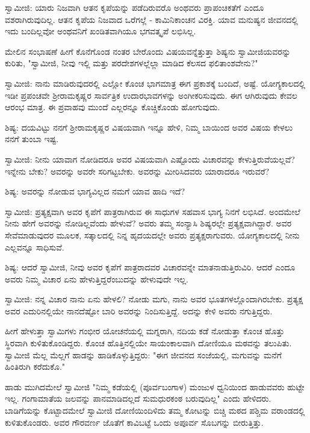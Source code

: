 ಸ್ವಾಮೀಜಿ: ಯಾರು ನಿಜವಾಗಿ ಆತನ ಕೃಪೆಯನ್ನು ಪಡೆದಿರುವರೊ ಅಂಥವರು ಪ್ರಾಪಂಚಿಕತೆಗೆ ಎಂದೂ ವಶರಾಗಿರುವುದಿಲ್ಲ. ಆತನ ಕೃಪೆಯ ನಿಜವಾದ ಒರೆಗಲ್ಲೆ - ಕಾಮಿನಿಕಾಂಚನ ವಿರಕ್ತಿ. ಯಾವ ಮನುಷ್ಯನ ಜೀವನದಲ್ಲಿ ಇದು ಬಂದಿಲ್ಲವೋ ಅಂಥವನಿಗೆ ಖಂಡಿತವಾಗಿಯೂ ಭಗವತ್ಕೃಪೆ ಲಭಿಸಿಲ್ಲ.

ಮೇಲಿನ ಸಂಭಾಷಣೆ ಹೀಗೆ ಕೊನೆಗೊಂಡ ನಂತರ ಬೇರೊಂದು ವಿಷಯವನ್ನೆತ್ತುತ್ತಾ ಶಿಷ್ಯನು ಸ್ವಾಮೀಜಿಯವರನ್ನು ಕುರಿತು, "ಸ್ವಾಮೀಜಿ, ನೀವು ಇಲ್ಲಿ ಮತ್ತು ಪರದೇಶಗಳಲ್ಲೆಲ್ಲಾ ಮಾಡಿದ ಕೆಲಸದ ಫಲಿತಾಂಶವೇನು?"

ಸ್ವಾಮೀಜಿ: ನಾನು ಮಾಡಿರುವುದರಲ್ಲಿ ಎಲ್ಲೋ ಕೊಂಚ ಭಾಗಮಾತ್ರ ಈಗ ಪ್ರಕಾಶಕ್ಕೆ ಬಂದಿದೆ, ಅಷ್ಟೆ. ಯೋಗ್ಯಕಾಲದಲ್ಲಿ ಇಡೀ ಪ್ರಪಂಚವೇ ಶ‍್ರೀರಾಮಕೃಷ್ಣರ ಸಾರ್ವತ್ರಿಕ ಉದಾರಭಾವಗಳನ್ನು ಅಂಗೀಕರಿಸುವುದು. ಈಗ ಆಗಿರುವುದು ಕೇವಲ ಆರಂಭ ಮಾತ್ರ. ಈ ಪ್ರವಾಹವು ಮುಂದೆ ಎಲ್ಲರನ್ನೂ ಕೊಚ್ಚಿಕೊಂಡು ಹೋಗುವುದು.

ಶಿಷ್ಯ: ದಯವಿಟ್ಟು ನನಗೆ ಶ‍್ರೀರಾಮಕೃಷ್ಣರ ವಿಷಯವಾಗಿ ಇನ್ನೂ ಹೇಳಿ, ನಿಮ್ಮ ಬಾಯಿಂದ ಅವರ ವಿಷಯ ಕೇಳಲು ನನಗೆ ತುಂಬಾ ಇಷ್ಟ.

ಸ್ವಾಮೀಜಿ: ನೀನು ಯಾವಾಗ ನೋಡಿದರೂ ಅವರ ವಿಷಯವಾಗಿ ಎಷ್ಟೊಂದು ವಿಚಾರವನ್ನು ಕೇಳುತ್ತಿರುವೆಯಲ್ಲವೆ? ಇನ್ನೇನು ಬೇಕು? ಅವರನ್ನು ಅವರೇ ಸರಿಗಟ್ಟಬೇಕು. ಅವರನ್ನು ಮೀರಿಸಿದವರು ಯಾರಾದರೂ ಇರುವರೆ?

ಶಿಷ್ಯ: ಅವರನ್ನು ನೋಡುವ ಭಾಗ್ಯವಿಲ್ಲದ ನಮಗೆ ಯಾವ ಹಾದಿ ಇದೆ?

ಸ್ವಾಮೀಜಿ: ಪ್ರತ್ಯಕ್ಷವಾಗಿ ಅವರ ಕೃಪೆಗೆ ಪಾತ್ರರಾಗಿರುವ ಈ ಸಾಧುಗಳ ಸಹವಾಸ ಭಾಗ್ಯ ನಿನಗೆ ಲಭಿಸಿದೆ. ಅಂದಮೇಲೆ ನೀನು ಹೇಗೆ ಅವರನ್ನು ನೋಡಿಲ್ಲವೆಂದು ಹೇಳುವೆ? ಅವರು ತಮ್ಮ ಸಂನ್ಯಾಸಿ ಶಿಷ್ಯರಲ್ಲೇ ಪ್ರತ್ಯಕ್ಷವಾಗಿದ್ದಾರೆ. ಅವರ ಸೇವೆಮಾಡುವುದರ ಮೂಲಕ, ಸತ್ಕಾಲದಲ್ಲಿ ನಿನ್ನ ಹೃದಯದಲ್ಲೇ ಅವರು ಪ್ರತ್ಯಕ್ಷರಾಗುವರು. ಯೋಗ್ಯಕಾಲದಲ್ಲಿ ನೀನು ಎಲ್ಲವನ್ನೂ ಸಾಧಿಸುವೆ.

ಶಿಷ್ಯ: ಆದರೆ ಸ್ವಾಮೀಜಿ, ನೀವು ಅವರ ಕೃಪೆಗೆ ಪಾತ್ರರಾದವರ ವಿಚಾರವನ್ನೇ ಮಾತನಾಡುತ್ತಿರುವಿರಿ. ಆದರೆ ಎಂದೂ ಅವರು ನಿಮ್ಮ ವಿಚಾರ ಏನು ಹೇಳುತ್ತಿದ್ದರೆಂಬುದನ್ನು ಹೇಳುವುದೇ ಇಲ್ಲ.

ಸ್ವಾಮೀಜಿ: ನನ್ನ ವಿಚಾರ ನಾನು ಏನು ಹೇಳಲಿ? ನೋಡು ಮಗು, ನಾನು ಅವರ ಭೂತಗಳಲ್ಲೊಂದಾಗಿರಬೇಕು. ಪ್ರತ್ಯಕ್ಷ ಅವರ ಎದುರಿನಲ್ಲಿಯೇ ನಾನದೆಷ್ಟೋ ಬಾರಿ ಅವರನ್ನು ನಿಂದಿಸುತ್ತಿದ್ದೆ. ಅದನ್ನು ಕೇಳಿ ಅವರು ನಗುತ್ತಿದ್ದರು.

ಹೀಗೆ ಹೇಳುತ್ತಾ ಸ್ವಾಮಿಗಳು ಗಂಭೀರ ಯೋಚನೆಯಲ್ಲಿ ಮಗ್ನರಾಗಿ, ನದಿಯ ಕಡೆ ನೋಡುತ್ತಾ ಕೊಂಚ ಹೊತ್ತು ಸ್ಥಿರವಾಗಿ ಕುಳಿತುಕೊಂಡಿದ್ದರು. ಕೊಂಚ ಹೊತ್ತಿನಲ್ಲಿಯೇ ಸಾಯಂಕಾಲವಾಗಿ ದೋಣಿಯೂ ಮಠವನ್ನು ತಲುಪಿತು. ಸ್ವಾಮೀಜಿ ಮೆಲ್ಲ ಮೆಲ್ಲಗೆ ಹಾಡನ್ನು ಹಾಡಿಕೊಳ್ಳುತ್ತಿದ್ದರು: "ಈಗ ಜೀವನದ ಸಂಜೆಯಲ್ಲಿ, ಮಗುವನ್ನು ಮನೆಗೆ ಹಿಂತಿರುಗಿ ಕರೆದುಕೊ."

ಹಾಡು ಮುಗಿದಮೇಲೆ ಸ್ವಾಮೀಜಿ "ನಿಮ್ಮ ಕಡೆಯಲ್ಲಿ (ಪೂರ್ವಬಂಗಾಳ) ಮಂಜುಳ ಧ್ವನಿಯಿಂದ ಹಾಡುವವರು ಹುಟ್ಟೇ ಇಲ್ಲ. ಗಂಗಾಮಾತೆಯ ಜಲವನ್ನು ಪಾನಮಾಡಿದಲ್ಲದೆ ಸುಮಧುರಕಂಠ ಬರುವುದಿಲ್ಲ" ಎಂದು ಹೇಳಿದರು. ಬಾಡಿಗೆಯನ್ನು ಕೊಟ್ಟಾದಮೇಲೆ ಸ್ವಾಮೀಜಿ ದೋಣಿಯಿಂದಿಳಿದು ತಮ್ಮ ಕೋಟನ್ನು ಬಿಚ್ಚಿ ಮಠದ ಪಶ್ಚಿಮ ವರಾಂಡದಲ್ಲಿ ಕುಳಿತುಕೊಂಡರು. ಅವರ ಗೌರವರ್ಣ ಜೊತೆಗೆ ಕಾವಿಬಟ್ಟೆ ಒಂದು ಅಪೂರ್ವ ಸೊಬಗನ್ನು ಬೀರುತ್ತಿತ್ತು.

\newpage

